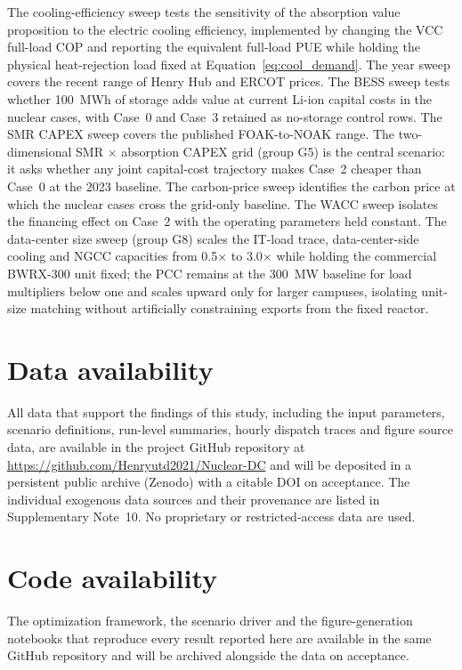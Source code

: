 \documentclass[sn-vancouver,Numbered]{sn-jnl}%
\begin{document}
The cooling-efficiency sweep tests the sensitivity of the absorption value proposition to the electric cooling efficiency, implemented by changing the VCC full-load COP and reporting the equivalent full-load PUE while holding the physical heat-rejection load fixed at Equation~\eqref{eq:cool_demand}. The year sweep covers the recent range of Henry Hub and ERCOT prices. The BESS sweep tests whether 100~MWh of storage adds value at current Li-ion capital costs in the nuclear cases, with Case~0 and Case~3 retained as no-storage control rows. The SMR CAPEX sweep covers the published FOAK-to-NOAK range. The two-dimensional SMR $\times$ absorption CAPEX grid (group G5) is the central scenario: it asks whether any joint capital-cost trajectory makes Case~2 cheaper than Case~0 at the 2023 baseline. The carbon-price sweep identifies the carbon price at which the nuclear cases cross the grid-only baseline. The WACC sweep isolates the financing effect on Case~2 with the operating parameters held constant. The data-center size sweep (group G8) scales the IT-load trace, data-center-side cooling and NGCC capacities from 0.5$\times$ to 3.0$\times$ while holding the commercial BWRX-300 unit fixed; the PCC remains at the 300~MW baseline for load multipliers below one and scales upward only for larger campuses, isolating unit-size matching without artificially constraining exports from the fixed reactor.

\section*{Data availability}
All data that support the findings of this study, including the input parameters, scenario definitions, run-level summaries, hourly dispatch traces and figure source data, are available in the project GitHub repository at \url{https://github.com/Henryutd2021/Nuclear-DC} and will be deposited in a persistent public archive (Zenodo) with a citable DOI on acceptance. The individual exogenous data sources and their provenance are listed in Supplementary Note~10. No proprietary or restricted-access data are used.

\section*{Code availability}
The optimization framework, the scenario driver and the figure-generation notebooks that reproduce every result reported here are available in the same GitHub repository and will be archived alongside the data on acceptance.
\end{document}
